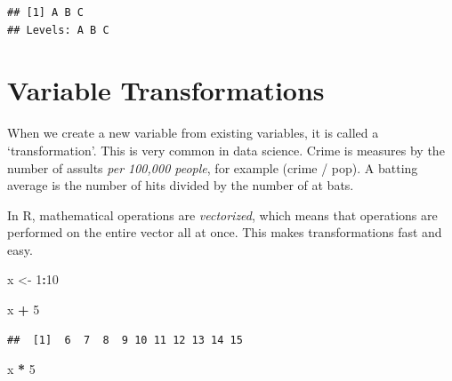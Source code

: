 \documentclass[]{book}
\newenvironment{Shaded}{\begin{snugshade}}{\end{snugshade}}
\newcommand{\DecValTok}[1]{\textcolor[rgb]{0.00,0.00,0.81}{#1}}
\newcommand{\KeywordTok}[1]{\textcolor[rgb]{0.13,0.29,0.53}{\textbf{#1}}}
\newcommand{\NormalTok}[1]{#1}
\newcommand{\OperatorTok}[1]{\textcolor[rgb]{0.81,0.36,0.00}{\textbf{#1}}}
\newcommand{\StringTok}[1]{\textcolor[rgb]{0.31,0.60,0.02}{#1}}
\theoremstyle{definition}
\theoremstyle{definition}
\theoremstyle{definition}
\theoremstyle{remark}
\begin{document}
\begin{Shaded}
\end{Shaded}

\begin{verbatim}
## [1] A B C
## Levels: A B C
\end{verbatim}

\begin{Shaded}
\end{Shaded}

\hypertarget{variable-transformations}{%
\section{Variable Transformations}\label{variable-transformations}}

When we create a new variable from existing variables, it is called a
`transformation'. This is very common in data science. Crime is measures
by the number of assults \emph{per 100,000 people}, for example (crime /
pop). A batting average is the number of hits divided by the number of
at bats.

In R, mathematical operations are \emph{vectorized}, which means that
operations are performed on the entire vector all at once. This makes
transformations fast and easy.

\begin{Shaded}
\begin{Highlighting}[]
\NormalTok{x <-}\StringTok{ }\DecValTok{1}\OperatorTok{:}\DecValTok{10}

\NormalTok{x }\OperatorTok{+}\StringTok{ }\DecValTok{5}
\end{Highlighting}
\end{Shaded}

\begin{verbatim}
##  [1]  6  7  8  9 10 11 12 13 14 15
\end{verbatim}

\begin{Shaded}
\begin{Highlighting}[]
\NormalTok{x }\OperatorTok{*}\StringTok{ }\DecValTok{5}
\end{Highlighting}
\end{Shaded}
\end{document}
